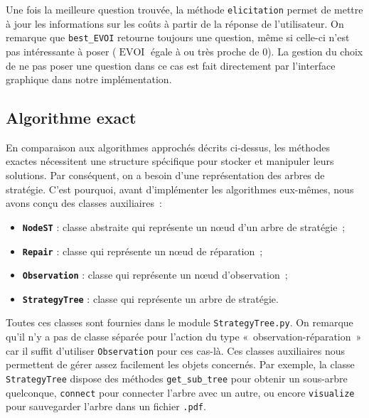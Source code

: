 \documentclass[a4paper,11pt]{article}
\theoremstyle{plain}
\theoremstyle{definition}
\DeclareMathOperator{\EVOI}{EVOI}
\begin{document}
Une fois la meilleure question trouvée, la méthode \texttt{elicitation} permet de mettre à jour les informations sur les coûts à partir de la réponse de l'utilisateur. On remarque que \texttt{best\_EVOI} retourne toujours une question, même si celle-ci n'est pas intéressante à poser ($\EVOI$ égale à ou très proche de $0$). La gestion du choix de ne pas poser une question dans ce cas est fait directement par l'interface graphique dans notre implémentation.

\subsection{Algorithme exact}
\label{SecImplExact}

En comparaison aux algorithmes approchés décrits ci-dessus, les méthodes exactes nécessitent une structure spécifique pour stocker et manipuler leurs solutions. Par conséquent, on a besoin d'une représentation des arbres de stratégie. C'est pourquoi, avant d'implémenter les algorithmes eux-mêmes, nous avons conçu des classes auxiliaires~:
\begin{itemize}
    \item \texttt{\textbf{NodeST}} : classe abstraite qui représente un nœud d'un arbre de stratégie~;
    \item \texttt{\textbf{Repair}} : classe qui représente un nœud de réparation~;
    \item \texttt{\textbf{Observation}} : classe qui représente un nœud d'observation~;
    \item \texttt{\textbf{StrategyTree}} : classe qui représente un arbre de stratégie.
\end{itemize}
Toutes ces classes sont fournies dans le module \texttt{StrategyTree.py}. On remarque qu'il n'y a pas de classe séparée pour l'action du type «~observation-réparation~» car il suffit d'utiliser \texttt{Observation} pour ces cas-là. Ces classes auxiliaires nous permettent de gérer assez facilement les objets concernés. Par exemple, la classe \texttt{StrategyTree} dispose des méthodes \texttt{get\_sub\_tree} pour obtenir un sous-arbre quelconque, \texttt{connect} pour connecter l'arbre avec un autre, ou encore \texttt{visualize} pour sauvegarder l'arbre dans un fichier \texttt{.pdf}.
\end{document}
